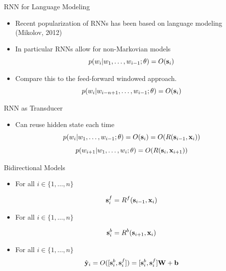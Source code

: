 \documentclass{beamer}
\begin{document}
\begin{frame}{RNN for Language Modeling}
  \begin{itemize}
  \item Recent popularization of RNNs has been based on language modeling (Mikolov, 2012)
    \air

  \item In particular RNNs allow for non-Markovian models
    \[ p(w_i | w_1, \ldots, w_{i-1};\theta) = O(\mathbf{s}_i) \]

    \air 

  \item Compare this to the feed-forward windowed approach.
    \[ p(w_i | w_{i-n+1}, \ldots, w_{i-1};\theta) = O(\mathbf{s}_i) \]
  \end{itemize}
\end{frame}


\begin{frame}{RNN as Transducer}
  \begin{center}
  \end{center}
  \begin{itemize}
  \item Can reuse hidden state each time
    \[ p(w_i | w_1, \ldots, w_{i-1};\theta) = O(\mathbf{s}_i) = O(R(\mathbf{s}_{i-1}, \mathbf{x}_{i})) \]
    \[ p(w_{i+1} | w_1, \ldots, w_{i};\theta) = O(R(\mathbf{s}_{i}, \mathbf{x}_{i+1})) \]
  \end{itemize}
\end{frame}


\begin{frame}{Bidirectional Models}
  \begin{itemize}
    \item For all $i \in \{1, \ldots, n \}$ 

      \[\mathbf{s}^f_{i} = R^{f}(\mathbf{s}_{i-1}, \mathbf{x}_i) \]

    \item For all $i \in \{1, \ldots, n \}$ 

      \[\mathbf{s}^b_{i} = R^{b}(\mathbf{s}_{i+1}, \mathbf{x}_i) \]

    \item For all $i \in \{1, \ldots, n \}$ 
      \[ \hat{\mathbf{y}}_i = O([\mathbf{s}^b_{i}, \mathbf{s}^f_{i}]) = [\mathbf{s}^b_{i}, \mathbf{s}^f_{i}] \mathbf{W} + \mathbf{b} \] 
  \end{itemize}
\end{frame}
\end{document}
